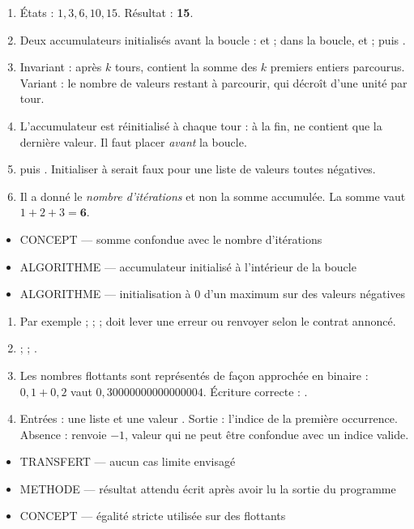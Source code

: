 \documentclass[10pt,a4paper]{article}
\begin{document}
\begin{enumerate}
\item États : $1, 3, 6, 10, 15$. Résultat : \textbf{15}.
\item Deux accumulateurs initialisés avant la boucle :  et  ; dans la boucle,  et  ; puis .
\item Invariant : après $k$ tours,  contient la somme des $k$ premiers entiers parcourus. Variant : le nombre de valeurs restant à parcourir, qui décroît d'une unité par tour.
\item L'accumulateur est réinitialisé à chaque tour : à la fin,  ne contient que la dernière valeur. Il faut placer  \emph{avant} la boucle.
\item {} puis . Initialiser à  serait faux pour une liste de valeurs toutes négatives.
\item Il a donné le \emph{nombre d'itérations} et non la somme accumulée. La somme vaut $1+2+3=\textbf{6}$.
\end{enumerate}
\begin{itemize}
\item \textsc{CONCEPT} --- somme confondue avec le nombre d'itérations
\item \textsc{ALGORITHME} --- accumulateur initialisé à l'intérieur de la boucle
\item \textsc{ALGORITHME} --- initialisation à 0 d'un maximum sur des valeurs négatives
\end{itemize}
\begin{enumerate}
\item Par exemple  ;  ;  ;  doit lever une erreur ou renvoyer  selon le contrat annoncé.
\item {} ;  ; .
\item Les nombres flottants sont représentés de façon approchée en binaire : $0{,}1+0{,}2$ vaut $0{,}30000000000000004$. Écriture correcte : .
\item Entrées : une liste  et une valeur . Sortie : l'indice de la première occurrence. Absence : renvoie $-1$, valeur qui ne peut être confondue avec un indice valide.
\end{enumerate}
\begin{itemize}
\item \textsc{TRANSFERT} --- aucun cas limite envisagé
\item \textsc{METHODE} --- résultat attendu écrit après avoir lu la sortie du programme
\item \textsc{CONCEPT} --- égalité stricte utilisée sur des flottants
\end{itemize}
\end{document}
